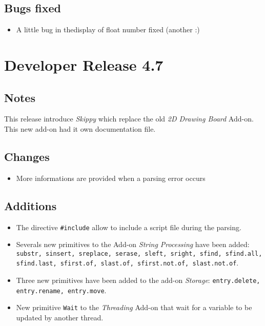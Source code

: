 \subsection{Bugs fixed}

\begin{itemize}
\item A little bug in thedisplay of float number fixed (another :)
\end{itemize}

\section{Developer Release 4.7}

\subsection{Notes}

This release introduce {\it Skippy} which replace the old {\em 2D Drawing Board} Add-on. This new add-on had it own documentation file. 

\subsection{Changes}

\begin{itemize}
\item More informations are provided when a parsing error occurs
\end{itemize}

\subsection{Additions}

\begin{itemize}
\item The directive {\tt \verb+#+include} allow to include a script file during the parsing.
\item Severals new primitives to the Add-on {\em String Processing} have been added: {\tt substr, sinsert, sreplace, serase, sleft, sright, sfind, sfind.all,\\ sfind.last, sfirst.of, slast.of, sfirst.not.of, slast.not.of}.
\item Three new primitives have been added to the add-on {\em Storage}: {\tt entry.delete, entry.rename, entry.move}.
\item New primitive {\tt Wait} to the {\it Threading} Add-on that wait for a variable to be updated by another thread.
\end{itemize}

